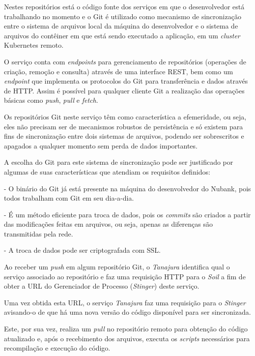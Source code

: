 \documentclass[twosideprint]{politex}
\begin{document}
	Nestes repositórios está o código fonte dos serviços em que o desenvolvedor está trabalhando no momento e o Git é utilizado como mecanismo de sincronização entre o sistema de arquivos local da máquina do desenvolvedor e o sistema de arquivos do contêiner em que está sendo executado a aplicação, em um \textit{cluster} Kubernetes remoto.
	
	O serviço conta com \textit{endpoints} para gerenciamento de repositórios (operações de criação, remoção e consulta) através de uma interface REST, bem como um \textit{endpoint} que implementa os protocolos do Git para transferência e dados através de HTTP. Assim é possível para qualquer cliente Git a realização das operações básicas como \textit{push}, \textit{pull} e \textit{fetch}.
	
	Os repositórios Git neste serviço têm como característica a efemeridade, ou seja, eles não precisam ser de mecanismos robustos de persistência e só existem para fins de sincronização entre dois sistemas de arquivos, podendo ser sobrescritos e apagados a qualquer momento sem perda de dados importantes.
	
	A escolha do Git para este sistema de sincronização pode ser justificado por algumas de suas características que atendiam os requisitos definidos:
	
	- O binário do Git já está presente na máquina do desenvolvedor do Nubank, pois todos trabalham com Git em seu dia-a-dia.
	
	- É um método eficiente para troca de dados, pois os \textit{commits} são criados a partir das modificações feitas em arquivos, ou seja, apenas as diferenças são transmitidas pela rede.
	
	- A troca de dados pode ser criptografada com SSL.

	Ao receber um \textit{push} em algum repositório Git, o \textit{Tanajura} identifica qual o serviço associado ao repositório e faz uma requisição HTTP para o \textit{Soil} a fim de obter a URL do Gerenciador de Processo (\textit{Stinger}) deste serviço.
	
	Uma vez obtida esta URL, o serviço \textit{Tanajura} faz uma requisição para o \textit{Stinger} avisando-o de que há uma nova versão do código disponível para ser sincronizada.
	
	Este, por sua vez, realiza um \textit{pull} no repositório remoto para obtenção do código atualizado e, após o recebimento dos arquivos, executa os \textit{scripts} necessários para recompilação e execução do código.
	
\end{document}
